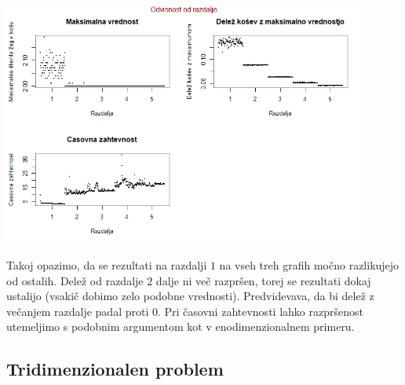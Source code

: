 \documentclass[a4paper, 11pt]{article}
\begin{document}
\bigbreak
\includegraphics[width=12cm, height= 8cm]{dim2_glede_na_razdaljo1.png}


Takoj opazimo, da se rezultati na razdalji $1$ na vseh treh grafih močno razlikujejo od ostalih. Delež od razdalje $2$ dalje ni več razpršen, torej se rezultati dokaj ustalijo (vsakič dobimo zelo podobne vrednosti). Predvidevava, da bi delež
z večanjem razdalje padal proti 0.
Pri časovni zahtevnosti lahko razpršenost utemeljimo s podobnim argumentom kot v enodimenzionalnem primeru.

\subsection{Tridimenzionalen problem}
\end{document}
